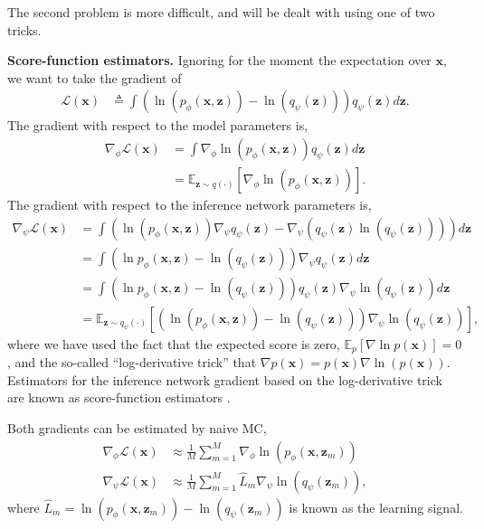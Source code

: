 The second problem is more difficult, and will be dealt with using one of two tricks.

{\bfseries Score-function estimators.} Ignoring for the moment the expectation over $\mathbf{x}$, we want to take the gradient of
\begin{align*}
	\mathcal{L}(\mathbf{x}) &\triangleq \int\left(\ln\left(p_\phi\left(\mathbf{x},\mathbf{z}\right)\right) - \ln\left(q_\psi\left(\mathbf{z}\right)\right)\right)q_\psi(\mathbf{z})d\mathbf{z}.
\end{align*}
The gradient with respect to the model parameters is,
\begin{align*}
	\nabla_\phi\mathcal{L}(\mathbf{x}) &= \int\nabla_\phi\ln\left(p_\phi(\mathbf{x},\mathbf{z})\right)q_\psi(\mathbf{z})d\mathbf{z}\\
	&= \mathbb{E}_{\mathbf{z}\sim q(\cdot)}\left[\nabla_\phi\ln\left(p_\phi(\mathbf{x},\mathbf{z})\right)\right].
\end{align*}
The gradient with respect to the inference network parameters is,
\begin{align*}
	\nabla_\psi\mathcal{L}(\mathbf{x}) &= \int\left(\ln\left(p_\phi\left(\mathbf{x},\mathbf{z}\right)\right)\nabla_\psi q_\psi\left(\mathbf{z}\right) - \nabla_\psi\left(q_\psi(\mathbf{z})\ln\left(q_\psi\left(\mathbf{z}\right)\right)\right)\right)d\mathbf{z}\\
	&= \int\left(\ln p_\phi\left(\mathbf{x},\mathbf{z}\right) - \ln\left(q_\psi\left(\mathbf{z}\right)\right)\right)\nabla_\psi q_\psi\left(\mathbf{z}\right)d\mathbf{z}\\
	&= \int\left(\ln p_\phi\left(\mathbf{x},\mathbf{z}\right) - \ln\left(q_\psi\left(\mathbf{z}\right)\right)\right)q_\psi(\mathbf{z})\nabla_\psi\ln\left(q_\psi\left(\mathbf{z}\right)\right)d\mathbf{z}\\
	&= \mathbb{E}_{\mathbf{z}\sim q_\psi(\cdot)}\left[\left(\ln\left(p_\phi\left(\mathbf{x},\mathbf{z}\right)\right) - \ln\left(q_\psi\left(\mathbf{z}\right)\right)\right)\nabla_\psi\ln\left(q_\psi(\mathbf{z})\right)\right],
\end{align*}
where we have used the fact that the expected score is zero, $\mathbb{E}_p[\nabla\ln p(\mathbf{x})]=0$, and the so-called ``log-derivative trick'' that $\nabla p(\mathbf{x})=p(\mathbf{x})\nabla\ln(p(\mathbf{x}))$. Estimators for the inference network gradient based on the log-derivative trick are known as score-function estimators \citep{SchulmanEtAl2015}.

Both gradients can be estimated by naive MC,
\begin{align*}
	\nabla_\phi\mathcal{L}(\mathbf{x}) &\approx \frac{1}{M}\sum^M_{m=1}\nabla_\phi\ln\left(p_\phi\left(\mathbf{x},\mathbf{z}_m\right)\right)\\
	\nabla_\psi\mathcal{L}(\mathbf{x}) &\approx \frac{1}{M}\sum^M_{m=1}\hat{L}_m\nabla_\psi\ln\left(q_\psi\left(\mathbf{z}_m\right)\right),
\end{align*}
where $\hat{L}_m=\ln\left(p_\phi(\mathbf{x},\mathbf{z}_m)\right) - \ln\left(q_\psi(\mathbf{z}_m)\right)$ is known as the learning signal.

